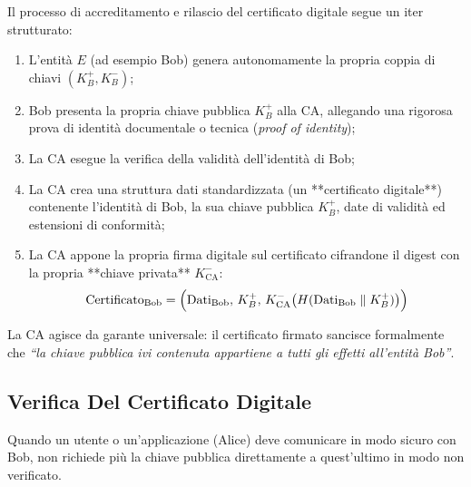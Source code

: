 \documentclass[11pt, a4paper]{article}
\begin{document}
Il processo di accreditamento e rilascio del certificato digitale segue un iter strutturato:
\begin{enumerate}[leftmargin=*]
    \item L'entità $E$ (ad esempio Bob) genera autonomamente la propria coppia di chiavi $(K_B^+, K_B^-)$;
    \item Bob presenta la propria chiave pubblica $K_B^+$ alla CA, allegando una rigorosa prova di identità documentale o tecnica (\emph{proof of identity});
    \item La CA esegue la verifica della validità dell'identità di Bob;
    \item La CA crea una struttura dati standardizzata (un **certificato digitale**) contenente l'identità di Bob, la sua chiave pubblica $K_B^+$, date di validità ed estensioni di conformità;
    \item La CA appone la propria firma digitale sul certificato cifrandone il digest con la propria **chiave privata** $K_{\text{CA}}^-$:
    \begin{equation}
    \text{Certificato}_{\text{Bob}} = \Bigl(\text{Dati}_{\text{Bob}}, \, K_B^+, \, K_{\text{CA}}^-\bigl(H(\text{Dati}_{\text{Bob}} \parallel K_B^+)\bigr)\Bigr)
    \end{equation}
\end{enumerate}

La CA agisce da garante universale: il certificato firmato sancisce formalmente che \emph{``la chiave pubblica ivi contenuta appartiene a tutti gli effetti all'entità Bob''}.

\subsection{Verifica Del Certificato Digitale}

Quando un utente o un'applicazione (Alice) deve comunicare in modo sicuro con Bob, non richiede più la chiave pubblica direttamente a quest'ultimo in modo non verificato.

\end{document}
